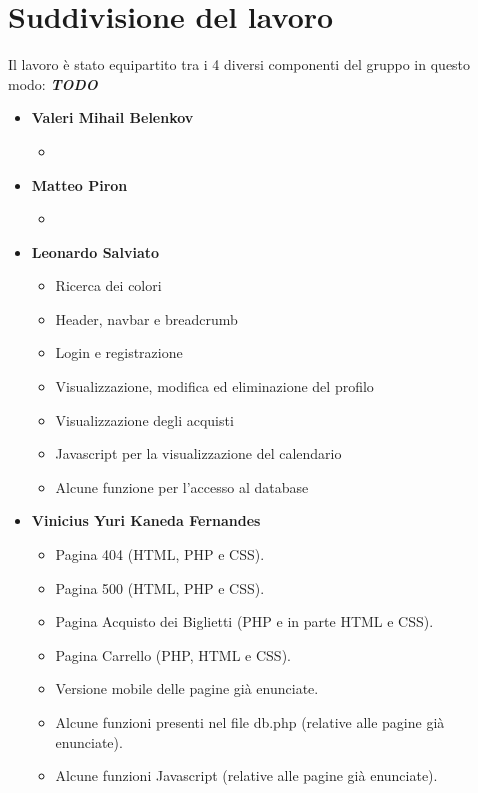 \section{Suddivisione del lavoro}
Il lavoro è stato equipartito tra i 4 diversi componenti del gruppo in questo modo:
\textbf{\textit{TODO}}
\begin{itemize}
    \item \textbf{Valeri Mihail Belenkov}
        \begin{itemize}
            \item 
        \end{itemize}
    \item \textbf{Matteo Piron}
        \begin{itemize}
            \item 
        \end{itemize}
    \item \textbf{Leonardo Salviato}
        \begin{itemize}
            \item Ricerca dei colori
            \item Header, navbar e breadcrumb
            \item Login e registrazione
            \item Visualizzazione, modifica ed eliminazione del profilo
            \item Visualizzazione degli acquisti
            \item Javascript per la visualizzazione del calendario
            \item Alcune funzione per l'accesso al database
        \end{itemize}
    \item \textbf{Vinicius Yuri Kaneda Fernandes}
        \begin{itemize}
            \item Pagina 404 (HTML, PHP e CSS).
            \item Pagina 500 (HTML, PHP e CSS).
            \item Pagina Acquisto dei Biglietti (PHP e in parte HTML e CSS).
            \item Pagina Carrello (PHP, HTML e CSS).
            \item Versione mobile delle pagine già enunciate.
            \item Alcune funzioni presenti nel file db.php (relative alle pagine già enunciate).
            \item Alcune funzioni Javascript (relative alle pagine già enunciate).
        \end{itemize}
\end{itemize}